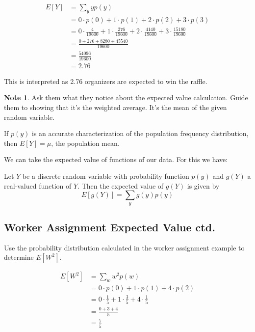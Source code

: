 \documentclass[11pt]{article}
\theoremstyle{definition}
\newtheorem{note}{Note}
\begin{document}
$$
	\begin{aligned}
		E[Y] & = \sum_y yp(y) \\
		& = 0 \cdot p(0) + 1 \cdot p(1) + 2 \cdot p(2) + 3 \cdot p(3) \\
		& = 0 \cdot \frac{4}{19600} + 1 \cdot \frac{276}{19600} + 2 \cdot \frac{4140}{19600} + 3 \cdot \frac{15180}{19600} \\
		& = \frac{0 + 276 + 8280 + 45540}{19600} \\
		& = \frac{54096}{19600} \\
		& = 2.76
	\end{aligned}
$$

This is interpreted as 2.76 organizers are expected to win the raffle.

\begin{note}
	Ask them what they notice about the expected value calculation. Guide them to showing that it's the weighted average. It's the mean of the given random variable.
\end{note}

If $p(y)$ is an accurate characterization of the population frequency distribution, then $E[Y]=\mu$, the population mean.

We can take the expected value of functions of our data. For this we have:

\begin{shaded}
	Let $Y$ be a discrete random variable with probability function $p(y)$ and $g(Y)$ a real-valued function of $Y$. Then the expected value of $g(Y)$ is given by
	$$
		E[g(Y)] = \sum_y g(y)p(y)
	$$
\end{shaded}

\subsection{Worker Assignment Expected Value ctd.}

Use the probability distribution calculated in the worker assignment example to determine $E[W^2]$.

$$
	\begin{aligned}
		E[W^2] & = \sum_w w^2p(w) \\
		& = 0 \cdot p(0) + 1 \cdot p(1) + 4 \cdot p(2) \\
		& = 0 \cdot \frac{1}{5} + 1 \cdot \frac{3}{5} + 4 \cdot \frac{1}{5} \\
		& = \frac{0 + 3 + 4}{5} \\
		& = \frac{7}{5}
	\end{aligned}
$$
\end{document}
